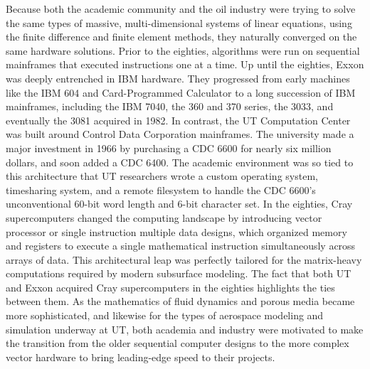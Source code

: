 Because both the academic community and the oil industry were trying to solve the same types of massive, multi-dimensional systems of linear equations, using the finite difference and finite element methods, they naturally converged on the same hardware solutions. Prior to the eighties, algorithms were run on sequential mainframes that executed instructions one at a time. Up until the eighties, Exxon was deeply entrenched in IBM hardware. They progressed from early machines like the IBM 604 and Card-Programmed Calculator to a long succession of IBM mainframes, including the IBM 7040, the 360 and 370 series, the 3033, and eventually the 3081 acquired in 1982. In contrast, the UT Computation Center was built around Control Data Corporation mainframes. The university made a major investment in 1966 by purchasing a CDC 6600 for nearly six million dollars, and soon added a CDC 6400. The academic environment was so tied to this architecture that UT researchers wrote a custom operating system, timesharing system, and a remote filesystem to handle the CDC 6600's unconventional 60-bit word length and 6-bit character set.
In the eighties, Cray supercomputers changed the computing landscape by introducing vector processor or single instruction multiple data designs, which organized memory and registers to execute a single mathematical instruction simultaneously across arrays of data. This architectural leap was perfectly tailored for the matrix-heavy computations required by modern subsurface modeling. The fact that both UT and Exxon acquired Cray supercomputers in the eighties highlights the ties between them. As the mathematics of fluid dynamics and porous media became more sophisticated, and likewise for the types of aerospace modeling and simulation underway at UT, both academia and industry were motivated to make the transition from the older sequential computer designs to the more complex vector hardware to bring leading-edge speed to their projects. 

